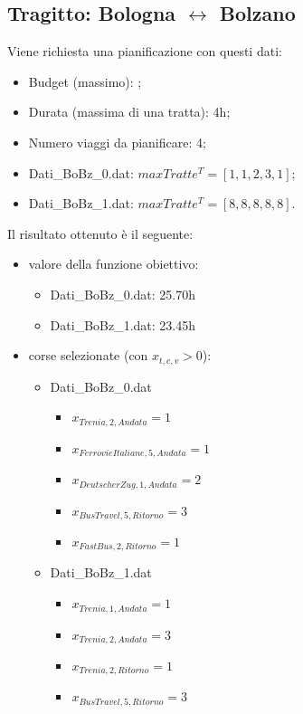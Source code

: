 \documentclass[main.tex]{subfiles}
\begin{document}
\subsection*{Tragitto: Bologna $\leftrightarrow$ Bolzano}
Viene richiesta una pianificazione con questi dati:
\begin{itemize}
    \item Budget (massimo): ;
    \item Durata (massima di una tratta): 4h;
    \item Numero viaggi da pianificare: 4;
    \item Dati\_BoBz\_0.dat: $maxTratte^T = [1,1,2,3,1]$;
    \item Dati\_BoBz\_1.dat: $maxTratte^T = [8,8,8,8,8]$.
\end{itemize}
Il risultato ottenuto è il seguente:
\begin{itemize}
    \item valore della funzione obiettivo:
    \begin{itemize}
        \item Dati\_BoBz\_0.dat: 25.70h
        \item Dati\_BoBz\_1.dat: 23.45h
    \end{itemize}
    \item corse selezionate (con $x_{t,c,v} > 0$):
    \begin{itemize}
        \item Dati\_BoBz\_0.dat
        \begin{itemize}
            \item $x_{Trenia,2,Andata} = 1$
            \item $x_{FerrovieItaliane,5,Andata} = 1$
            \item $x_{DeutscherZug,1,Andata} = 2$
            \item $x_{BusTravel,5,Ritorno} = 3$
            \item $x_{FastBus,2,Ritorno} = 1$
        \end{itemize}
        \item Dati\_BoBz\_1.dat
        \begin{itemize}
            \item $x_{Trenia,1,Andata} = 1$
            \item $x_{Trenia,2,Andata} = 3$
            \item $x_{Trenia,2,Ritorno} = 1$
            \item $x_{BusTravel,5,Ritorno} = 3$
        \end{itemize}

\end{itemize}
\end{itemize}
\end{document}
